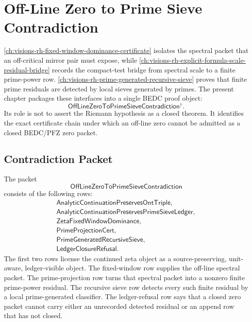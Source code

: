 \chapter{Off-Line Zero to Prime Sieve Contradiction}
\label{ch:visions-rh-offline-zero-prime-sieve-contradiction}

\autoref{ch:visions-rh-fixed-window-dominance-certificate} isolates the
spectral packet that an off-critical mirror pair must expose, while
\autoref{ch:visions-rh-explicit-formula-scale-residual-bridge} records
the compact-test bridge from spectral scale to a finite prime-power
row.  \autoref{ch:visions-rh-prime-generated-recursive-sieve} proves
that finite prime residuals are detected by local sieves generated by
primes.  The present chapter packages these interfaces into a single
BEDC proof object:
$$
\mathsf{OffLineZeroToPrimeSieveContradiction}^{\uparrow}.
$$
Its role is not to assert the Riemann hypothesis as a closed theorem.
It identifies the exact certificate chain under which an off-line zero
cannot be admitted as a closed BEDC/PFZ zero packet.

\section{Contradiction Packet}
\label{sec:rh-offline-zero-prime-sieve-contradiction-packet}

\begin{definition}[OffLineZeroToPrimeSieveContradiction]
\label{def:rh-offline-zero-prime-sieve-contradiction}
The packet
$$
\mathsf{OffLineZeroToPrimeSieveContradiction}
$$
consists of the following rows:
$$
\begin{gathered}
\mathsf{AnalyticContinuationPreservesOntTriple},\\
\mathsf{AnalyticContinuationPreservesPrimeSieveLedger},\\
\mathsf{ZetaFixedWindowDominance},\\
\mathsf{PrimeProjectionCert},\\
\mathsf{PrimeGeneratedRecursiveSieve},\\
\mathsf{LedgerClosureRefusal}.
\end{gathered}
$$
The first two rows license the continued zeta object as a
source-preserving, unit-aware, ledger-visible object.  The fixed-window
row supplies the off-line spectral packet.  The prime-projection row
turns that spectral packet into a nonzero finite prime-power residual.
The recursive sieve row detects every such finite residual by a local
prime-generated classifier.  The ledger-refusal row says that a closed
zero packet cannot carry either an unrecorded detected residual or an
append row that has not closed.
\end{definition}

